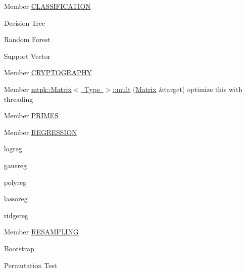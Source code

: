 
\begin{DoxyRefList}
\item[Member \mbox{\hyperlink{ml_8hpp_a669750181416ae68a4b4684e5006f733}{CLASSIFICATION}} ]\label{todo__todo000003}%
%

\begin{DoxyItemize}
\item Decision Tree
\item Random Forest
\item Support Vector  
\end{DoxyItemize}
\item[Member \mbox{\hyperlink{nt_8hpp_a7e35c8ec7ddf6c921ac513fdea803509}{CRYPTOGRAPHY}} ]\label{todo__todo000006}%
%
  
\item[Member \mbox{\hyperlink{classmtpk_1_1Matrix_aaf09c65a0c5214525caf887405a522fc}{mtpk\+::Matrix$<$ Type $>$\+::mult}} (\mbox{\hyperlink{classmtpk_1_1Matrix}{Matrix}} \&target)]\label{todo__todo000001}%
%
optimize this with threading  
\item[Member \mbox{\hyperlink{nt_8hpp_a48293241e70c61f3645fc82a34b6c75e}{PRIMES}} ]\label{todo__todo000005}%
%
  
\item[Member \mbox{\hyperlink{ml_8hpp_a8b483716c17fe4c5365714ca8582da43}{REGRESSION}} ]\label{todo__todo000002}%
%

\begin{DoxyItemize}
\item logreg
\item gausreg
\item polyreg
\item lassoreg
\item ridgereg  
\end{DoxyItemize}
\item[Member \mbox{\hyperlink{ml_8hpp_ae1704ccaaf93f8f9a83c8712bf0cf4aa}{RESAMPLING}} ]\label{todo__todo000004}%
%

\begin{DoxyItemize}
\item Bootstrap
\item Permutation Test 
\end{DoxyItemize}
\end{DoxyRefList}